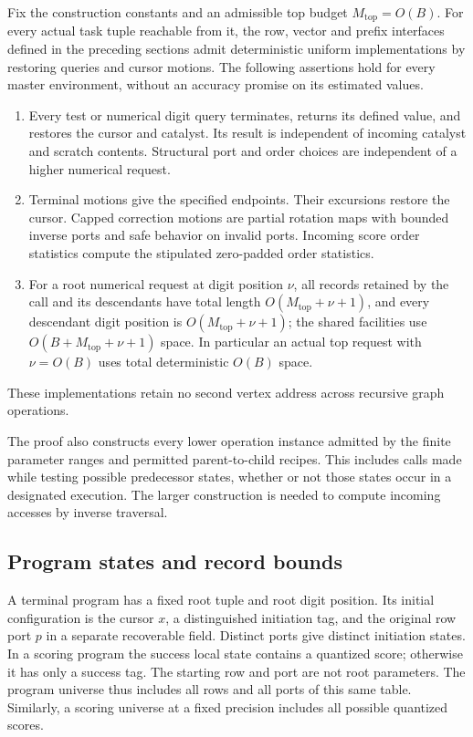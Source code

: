\begin{theorem}\label{thm:ctrl-realization}
Fix the construction constants and an admissible top budget
$M_{\mathrm{top}}=O(B)$.  For every actual task tuple reachable from it,
the row, vector and prefix interfaces defined in the preceding sections
admit deterministic uniform implementations by restoring queries and
cursor motions.
The following assertions hold for every master environment, without an
accuracy promise on its estimated values.
\begin{enumerate}
\item Every test or numerical digit query terminates, returns its
  defined value, and restores the cursor and catalyst.  Its result is
  independent of incoming catalyst and scratch contents.  Structural
  port and order choices are independent of a higher numerical request.
\item Terminal motions give the specified endpoints.  Their excursions
  restore the cursor.  Capped correction motions are partial rotation maps with bounded inverse ports and safe behavior on invalid ports.
  Incoming score order statistics compute the stipulated zero-padded order statistics.
\item For a root numerical request at digit position $\nu$, all records retained by the
  call and its descendants have total length $O(M_{\mathrm{top}}+\nu+1)$,
  and every descendant digit position is $O(M_{\mathrm{top}}+\nu+1)$; the shared
  facilities use $O(B+M_{\mathrm{top}}+\nu+1)$ space.  In particular an
  actual top request with $\nu=O(B)$ uses total deterministic $O(B)$ space.
\end{enumerate}
These implementations retain no second
vertex address across recursive graph operations.
\end{theorem}

The proof also constructs every lower operation instance admitted by the
finite parameter ranges and permitted parent-to-child recipes.  This
includes calls made while testing possible predecessor states, whether
or not those states occur in a designated execution.  The larger
construction is needed to compute incoming accesses by inverse traversal.

\subsection{Program states and record bounds}\label{sec:ctrl-graphs}

A terminal program has a fixed root tuple and root digit position.  Its initial
configuration is the cursor $x$, a distinguished initiation tag, and the
original row port $p$ in a separate recoverable field.  Distinct ports
give distinct initiation states.  In a scoring program the success local state contains a
quantized score; otherwise it has only a success tag.  The starting row
and port are not root parameters.  The program universe thus includes
all rows and all ports of this same table.  Similarly, a scoring
universe at a fixed precision includes all possible quantized scores.

